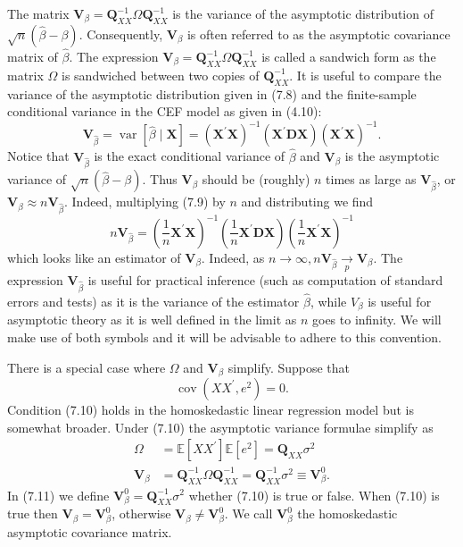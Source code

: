 \documentclass[10pt]{article}
\begin{document}
The matrix $\boldsymbol{V}_{\beta}=\boldsymbol{Q}_{X X}^{-1} \Omega \boldsymbol{Q}_{X X}^{-1}$ is the variance of the asymptotic distribution of $\sqrt{n}(\widehat{\beta}-\beta)$. Consequently, $\boldsymbol{V}_{\beta}$ is often referred to as the asymptotic covariance matrix of $\widehat{\beta}$. The expression $\boldsymbol{V}_{\beta}=\boldsymbol{Q}_{X X}^{-1} \Omega \boldsymbol{Q}_{X X}^{-1}$ is called a sandwich form as the matrix $\Omega$ is sandwiched between two copies of $\boldsymbol{Q}_{X X}^{-1}$. It is useful to compare the variance of the asymptotic distribution given in (7.8) and the finite-sample conditional variance in the CEF model as given in (4.10):
$$
\boldsymbol{V}_{\widehat{\beta}}=\operatorname{var}[\widehat{\beta} \mid \boldsymbol{X}]=\left(\boldsymbol{X}^{\prime} \boldsymbol{X}\right)^{-1}\left(\boldsymbol{X}^{\prime} \boldsymbol{D} \boldsymbol{X}\right)\left(\boldsymbol{X}^{\prime} \boldsymbol{X}\right)^{-1} .
$$
Notice that $\boldsymbol{V}_{\widehat{\beta}}$ is the exact conditional variance of $\widehat{\beta}$ and $\boldsymbol{V}_{\beta}$ is the asymptotic variance of $\sqrt{n}(\widehat{\beta}-\beta)$. Thus $\boldsymbol{V}_{\beta}$ should be (roughly) $n$ times as large as $\boldsymbol{V}_{\widehat{\beta}}$, or $\boldsymbol{V}_{\beta} \approx n \boldsymbol{V}_{\widehat{\beta}}$. Indeed, multiplying (7.9) by $n$ and distributing we find
$$
n \boldsymbol{V}_{\widehat{\beta}}=\left(\frac{1}{n} \boldsymbol{X}^{\prime} \boldsymbol{X}\right)^{-1}\left(\frac{1}{n} \boldsymbol{X}^{\prime} \boldsymbol{D} \boldsymbol{X}\right)\left(\frac{1}{n} \boldsymbol{X}^{\prime} \boldsymbol{X}\right)^{-1}
$$
which looks like an estimator of $\boldsymbol{V}_{\beta}$. Indeed, as $n \rightarrow \infty, n \boldsymbol{V}_{\widehat{\beta}} \underset{p}{\rightarrow} \boldsymbol{V}_{\beta}$. The expression $\boldsymbol{V}_{\widehat{\beta}}$ is useful for practical inference (such as computation of standard errors and tests) as it is the variance of the estimator $\widehat{\beta}$, while $V_{\beta}$ is useful for asymptotic theory as it is well defined in the limit as $n$ goes to infinity. We will make use of both symbols and it will be advisable to adhere to this convention.

There is a special case where $\Omega$ and $\boldsymbol{V}_{\beta}$ simplify. Suppose that
$$
\operatorname{cov}\left(X X^{\prime}, e^{2}\right)=0 .
$$
Condition (7.10) holds in the homoskedastic linear regression model but is somewhat broader. Under (7.10) the asymptotic variance formulae simplify as
$$
\begin{aligned}
\Omega &=\mathbb{E}\left[X X^{\prime}\right] \mathbb{E}\left[e^{2}\right]=\boldsymbol{Q}_{X X} \sigma^{2} \\
\boldsymbol{V}_{\beta} &=\boldsymbol{Q}_{X X}^{-1} \Omega \boldsymbol{Q}_{X X}^{-1}=\boldsymbol{Q}_{X X}^{-1} \sigma^{2} \equiv \boldsymbol{V}_{\beta}^{0} .
\end{aligned}
$$
In (7.11) we define $\boldsymbol{V}_{\beta}^{0}=\boldsymbol{Q}_{X X}^{-1} \sigma^{2}$ whether (7.10) is true or false. When (7.10) is true then $\boldsymbol{V}_{\beta}=\boldsymbol{V}_{\beta}^{0}$, otherwise $\boldsymbol{V}_{\beta} \neq \boldsymbol{V}_{\beta}^{0}$. We call $\boldsymbol{V}_{\beta}^{0}$ the homoskedastic asymptotic covariance matrix.
\end{document}
